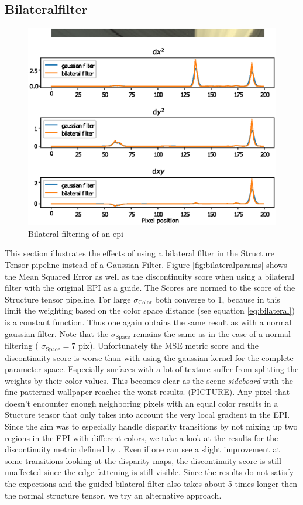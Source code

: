 \documentclass  [
  paper    = a4,
  BCOR     = 10mm,
  twoside,
  fontsize = 12pt,
  fleqn,
  toc      = bibnumbered,
  toc      = listofnumbered,
  numbers  = noendperiod,
  headings = normal,
  listof   = leveldown,
  version  = 3.03
]                                       {scrreprt}
\begin{document}
\subsection{Bilateralfilter}
\begin{figure}
	\centering
	\includegraphics[width=0.7\linewidth]{images/bilat}
	\caption[Bilateral filtering]{Bilateral filtering of an epi }
	\label{fig:bilat}
\end{figure}
 This section illustrates the effects of using a bilateral filter in the Structure Tensor pipeline instead of a Gaussian Filter. Figure \ref{fig:bilateralparams} shows the Mean Squared Error as well as the discontinuity score when using a bilateral filter with the original EPI as a guide. The Scores are normed to the score of the Structure tensor pipeline. For large $\sigma_\text{Color}$ both converge to 1, because in this limit the weighting based on the color space distance (see equation \ref{eq:bilateral}) is a constant function. Thus one again obtains the same result as with a normal gaussian filter. Note that the $\sigma_\text{Space}$ remains the same as in the case of a normal filtering ( $\sigma_\text{Space}=7$ pix). Unfortunately the MSE metric score and the discontinuity score is worse than with using the gaussian kernel for the complete parameter space. Especially surfaces with a lot of texture suffer from splitting the weights by their color values. This becomes clear as the scene \textit{sideboard} with the fine patterned wallpaper reaches the worst results. (PICTURE). Any pixel that doesn't encounter enough neighboring pixels with an equal color results in a Stucture tensor that only takes into account the very local gradient in the EPI. Since the aim was to especially handle disparity transitions by not mixing up two regions in the EPI with different colors, we take a look at the results for the discontinuity metric defined by \cite{honauer2016benchmark}. Even if one can see a slight improvement at some transitions looking at the disparity maps, the discontinuity score is still unaffected since the edge fattening is still visible. Since the results do not satisfy the expections and the guided bilateral filter also takes about 5 times longer then the normal structure tensor, we try an alternative approach.\\
\end{document}
